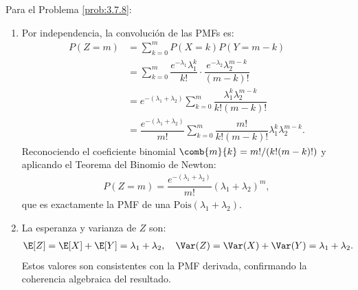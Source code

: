 \begin{solucion}
	\label{sol:3.7.8}
	Para el Problema \ref{prob:3.7.8}:
	\begin{enumerate}
		\item Por independencia, la convolución de las PMFs es:
		\begin{align*}
			P(Z = m) &= \sum_{k=0}^{m} P(X = k) P(Y = m-k) \\
			&= \sum_{k=0}^{m} \dfrac{e^{-\lambda_{1}} \lambda_{1}^{k}}{k!} \cdot \dfrac{e^{-\lambda_{2}} \lambda_{2}^{m-k}}{(m-k)!} \\
			&= e^{-(\lambda_{1} + \lambda_{2})} \sum_{k=0}^{m} \dfrac{\lambda_{1}^{k} \lambda_{2}^{m-k}}{k! (m-k)!} \\
			&= \dfrac{e^{-(\lambda_{1} + \lambda_{2})}}{m!} \sum_{k=0}^{m} \dfrac{m!}{k!(m-k)!} \lambda_{1}^{k} \lambda_{2}^{m-k}.
		\end{align*}
		Reconociendo el coeficiente binomial $\comb{m}{k} = m!/(k!(m-k)!)$ y aplicando el Teorema del Binomio de Newton:
		\begin{align*}
			P(Z = m) = \dfrac{e^{-(\lambda_{1} + \lambda_{2})}}{m!} (\lambda_{1} + \lambda_{2})^{m},
		\end{align*}
		que es exactamente la PMF de una $\text{Pois}(\lambda_{1} + \lambda_{2})$.
		\item La esperanza y varianza de $Z$ son:
		\begin{align*}
			\E[Z] = \E[X] + \E[Y] = \lambda_{1} + \lambda_{2}, \quad \Var(Z) = \Var(X) + \Var(Y) = \lambda_{1} + \lambda_{2}.
		\end{align*}
		Estos valores son consistentes con la PMF derivada, confirmando la coherencia algebraica del resultado. \qedhere
	\end{enumerate}
\end{solucion}

